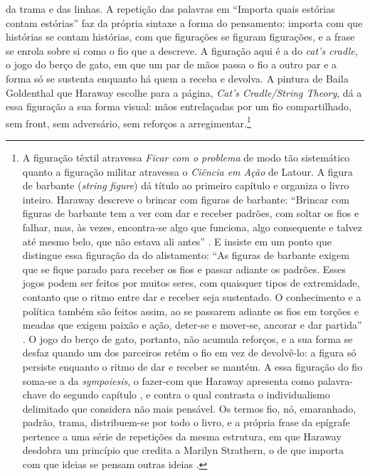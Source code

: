 da trama e das linhas. A repetição das palavras em \enquote{Importa quais estórias contam estórias} faz da própria sintaxe a forma do pensamento: importa com que histórias se contam histórias, com que figurações se figuram figurações, e a frase se enrola sobre si como o fio que a descreve. A figuração aqui é a do \textit{cat's cradle}, o jogo do berço de gato, em que um par de mãos passa o fio a outro par e a forma só se sustenta enquanto há quem a receba e devolva. A pintura de Baila Goldenthal que Haraway escolhe para a página, \textit{Cat's Cradle/String Theory}, dá a essa figuração a sua forma visual: mãos entrelaçadas por um fio compartilhado, sem front, sem adversário, sem reforços a arregimentar.\footnote{A figuração têxtil atravessa \textit{Ficar com o problema} de modo tão sistemático quanto a figuração militar atravessa o \textit{Ciência em Ação} de Latour. A figura de barbante (\textit{string figure}) dá título ao primeiro capítulo e organiza o livro inteiro. Haraway descreve o brincar com figuras de barbante: \enquote{Brincar com figuras de barbante tem a ver com dar e receber padrões, com soltar os fios e falhar, mas, às vezes, encontra-se algo que funciona, algo consequente e talvez até mesmo belo, que não estava ali antes} \parencite[p.~24]{Haraway2023Ficar}. E insiste em um ponto que distingue essa figuração da do alistamento: \enquote{As figuras de barbante exigem que se fique parado para receber os fios e passar adiante os padrões. Esses jogos podem ser feitos por muitos seres, com quaisquer tipos de extremidade, contanto que o ritmo entre dar e receber seja sustentado. O conhecimento e a política também são feitos assim, ao se passarem adiante os fios em torções e meadas que exigem paixão e ação, deter-se e mover-se, ancorar e dar partida} \parencite[pp.~24--25]{Haraway2023Ficar}. O jogo do berço de gato, portanto, não acumula reforços, e a sua forma se desfaz quando um dos parceiros retém o fio em vez de devolvê-lo: a figura só persiste enquanto o ritmo de dar e receber se mantém. A essa figuração do fio soma-se a da \textit{sympoiesis}, o fazer-com que Haraway apresenta como palavra-chave do segundo capítulo \parencite{Haraway2023Ficar}, e contra o qual contrasta o individualismo delimitado que considera não mais pensável. Os termos fio, nó, emaranhado, padrão, trama, distribuem-se por todo o livro, e a própria frase da epígrafe pertence a uma série de repetições da mesma estrutura, em que Haraway desdobra um princípio que credita a Marilyn Strathern, o de que importa com que ideias se pensam outras ideias \parencite{Haraway2023Ficar}.}

